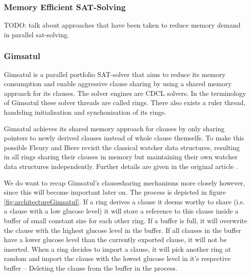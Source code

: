 \documentclass[12pt,a4paper,twoside]{scrartcl}
\numberwithin{equation}{section}
\begin{document}
\subsubsection{Memory Efficient SAT-Solving}

TODO: talk about approaches that have been taken to reduce memory demand in parallel sat-solving.

\subsubsection{Gimsatul}

Gimsatul \cite{gimsatul} is a parallel portfolio SAT-solver that aims to reduce its memory consumption and enable aggressive clause sharing by using a shared memory approach for its clauses. The solver engines are CDCL solvers. In the terminology of Gimsatul these solver threads are called rings. There also exists a ruler thread, handeling initialisation and synchonisation of its rings.

Gimsatul achieves its shared memory approach for clauses by only sharing pointers to newly derived clauses instead of whole clause themselfs. To make this possible Fleury and Biere revisit the classical watcher data structures, resulting in all rings sharing their clauses in memory but maintaining their own watcher data structures independently. Further details are given in the original article \cite{gimsatul}.

We do want to recap Gimsatul's clausesharing mechanisms more closely however, since this will become important later on. The process is depicted in figure \ref{fig:architectureGimsatul}. If a ring derives a clause it deems worthy to share (i.e. a clause with a low glucose level) it will store a reference to this clause inside a buffer of small constant size for each other ring. If a buffer is full, it will overwrite the clause with the highest glucose level in the buffer. If all clauses in the buffer have a lower glucose level than the currently exported clause, it will not be inserted. When a ring decides to import a clause, it will pick another ring at random and import the clause with the lowest glucose level in it's respective buffer -- Deleting the clause from the buffer in the process.
\end{document}
